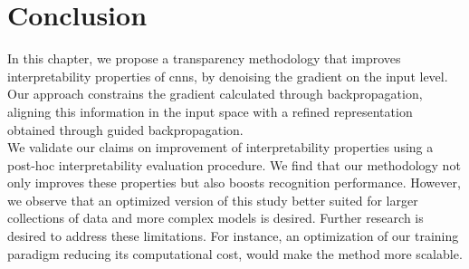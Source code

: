 \section{Conclusion}
In this chapter, we propose a transparency methodology that improves interpretability properties 
of \glspl{cnn}, by denoising the gradient on the input level. Our approach constrains the 
gradient calculated through backpropagation, aligning this information in the input space with a 
refined representation obtained through guided backpropagation.\\

\noindent We validate our claims on improvement of interpretability properties using a post-hoc 
interpretability evaluation procedure. We find that our methodology not only 
improves these properties but also boosts recognition performance. However, we 
observe that an optimized version of this study better suited for larger collections of data and 
more complex models is desired. Further research is desired to address these limitations.
For instance, an optimization of our training paradigm reducing its computational cost, would 
make the method more scalable.
